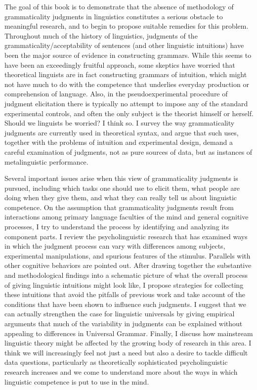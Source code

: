 
The goal of this book is to demonstrate that the absence of methodology of grammaticality judgments in linguistics constitutes a serious obstacle to meaningful research, and to begin to propose suitable remedies for this problem. Throughout much of the history of linguistics, judgments of the grammaticality/acceptability of sentences (and other linguistic intuitions) have been the major source of evidence in constructing grammars. While this seems to have been an exceedingly fruitful approach, some skeptics have worried that theoretical linguists are in fact constructing grammars of intuition, which might not have much to do with the competence that underlies everyday production or comprehension of language. Also, in the pseudoexperimental procedure of judgment elicitation there is typically no attempt to impose any of the standard experimental controls, and often the only subject is the theorist himself or herself. Should we linguists be worried? I think so. I survey the way grammaticality judgments are currently used in theoretical syntax, and argue that such uses, together with the problems of intuition and experimental design, demand a careful examination of judgments, not as pure sources of data, but as instances of metalinguistic performance.

Several important issues arise when this view of grammaticality judgments is pursued, including which tasks one should use to elicit them, what people are doing when they give them, and what they can really tell us about linguistic competence. On the assumption that grammaticality judgments result from interactions among primary language faculties of the mind and general cognitive processes, I try to understand the process by identifying and analyzing its component parts. I review the psycholinguistic research that has examined ways in which the judgment process can vary with differences among subjects, experimental manipulations, and spurious features of the stimulus. Parallels with other cognitive behaviors are pointed out. After drawing together the substantive and methodological findings into a schematic picture of what the overall process of giving linguistic intuitions might look like, I propose strategies for collecting these intuitions that avoid the pitfalls of previous work and take account of the conditions that have been shown to influence such judgments. I suggest that we can actually strengthen the case for linguistic universals by giving empirical arguments that much of the variability in judgments can be explained without appealing to differences in Universal Grammar. Finally, I discuss how mainstream linguistic theory might be affected by the growing body of research in this area. I think we will increasingly feel not just a need but also a desire to tackle difficult data questions, particularly as theoretically sophisticated psycholinguistic research increases and we come to understand more about the ways in which linguistic competence is put to use in the mind.
